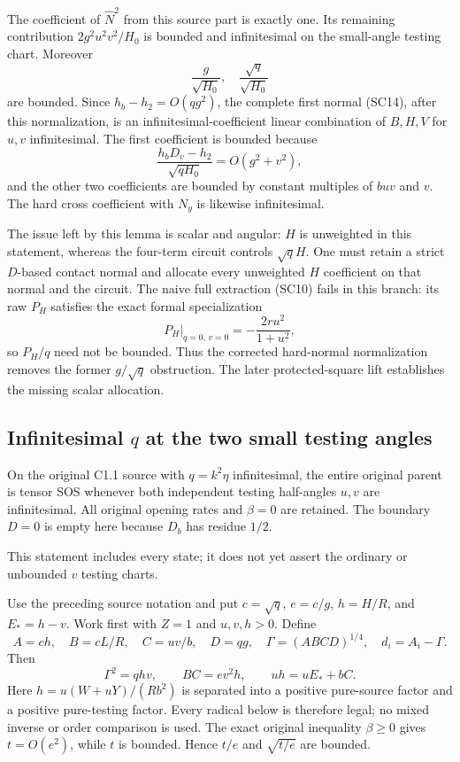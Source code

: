 The coefficient of $\widehat N^2$ from this source part is exactly
one. Its remaining contribution $2g^2u^2v^2/H_0$ is bounded and
infinitesimal on the small-angle testing chart. Moreover
\[
 \frac{g}{\sqrt{H_0}},\quad
 \frac{\sqrt q}{\sqrt{H_0}}
\]
are bounded. Since $h_b-h_2=O(qg^2)$, the complete first normal
(SC14), after this normalization, is an infinitesimal-coefficient
linear combination of $B,H,V$ for $u,v$ infinitesimal. The first
coefficient is bounded because
\[
 \frac{h_bD_v-h_2}{\sqrt{qH_0}}
            =O(g^2+v^2),
\]
and the other two coefficients are bounded by constant multiples of
$buv$ and $v$. The hard cross coefficient with $N_y$ is likewise
infinitesimal.

The issue left by this lemma is scalar and angular: $H$ is unweighted in this
statement, whereas the four-term circuit controls $\sqrt q H$.
One must retain a strict $D$-based contact normal and allocate every
unweighted $H$ coefficient on that normal and the circuit. The
naive full extraction (SC10) fails in this branch: its raw $P_H$
satisfies the exact formal specialization
\[
       P_H\big|_{q=0,\,v=0}=-\frac{2ru^2}{1+u^2},
\]
so $P_H/q$ need not be bounded. Thus the corrected hard-normal
normalization removes the former $g/\sqrt q$ obstruction. The later
protected-square lift establishes the missing scalar allocation.



\subsection{Infinitesimal $q$ at the two small testing angles}

\label{component:pc376284fc7ae}

\label{pc376284fc7ae:sec:r7-c1-q-inf-local}
\begin{theorem}
On the original C1.1 source with $q=k^2\eta$ infinitesimal, the entire
original parent is tensor SOS whenever both independent testing
half-angles $u,v$ are infinitesimal. All original opening rates and
$\beta=0$ are retained. The boundary $D=0$ is empty here because
$D_b$ has residue $1/2$.
\end{theorem}
This statement includes every state; it does not yet assert the
ordinary or unbounded $v$ testing charts.

Use the preceding source notation and put $c=\sqrt q$, $e=c/g$,
$h=H/R$, and $E_*=h-v$. Work first with $Z=1$ and $u,v,h>0$.
Define
\[
 A=ch,\quad B=cL/R,\quad C=uv/b,\quad D=qg,\quad
 \Gamma=(ABCD)^{1/4},\quad d_i=A_i-\Gamma.
\]
Then
\[
 \Gamma^2=qhv,\qquad BC=e v^2h,\qquad
 u h=uE_*+bC.
 \tag{QI1}
\]
Here $h=u(W+uY)/(Rb^2)$ is separated into a positive pure-source
factor and a positive pure-testing factor. Every radical below is
therefore legal; no mixed inverse or order comparison is used.
The exact original inequality $\beta\ge0$ gives $t=O(e^2)$, while
$t$ is bounded. Hence $t/e$ and $\sqrt{t/e}$ are bounded.

